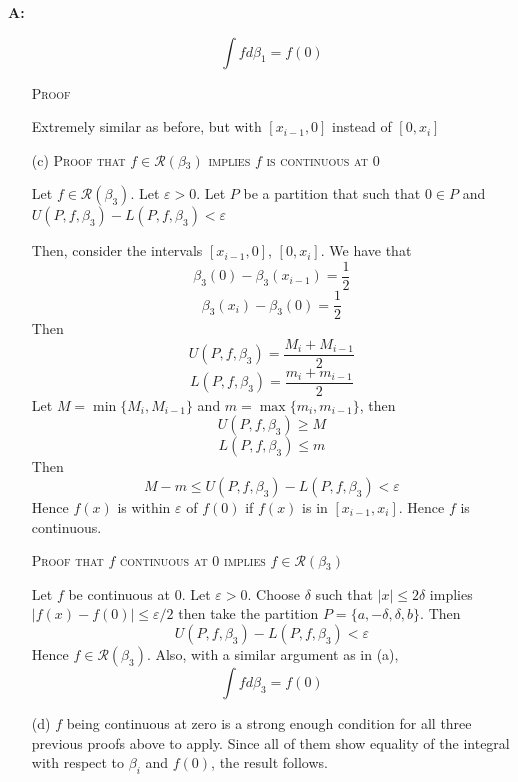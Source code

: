\documentclass{article}
\newenvironment{Answer} {\par\noindent\textbf{A:}} {}
\begin{document}
\begin{Answer}
\begin{itemize}
        \[\int f d\beta_1 = f(0)\]

        \textsc{Proof}

        Extremely similar as before, but with $[x_{i-1}, 0]$ instead of $[0, x_i]$

        \item [(c)]         
            \textsc{Proof that $f \in \mathscr{R}(\beta_3)$ implies $f$ is continuous at $0$}

            Let $f \in \mathscr{R}(\beta_3)$. Let $\varepsilon > 0$. Let $P$ be a partition that such that $0 \in P$ and $U(P, f, \beta_3) - L(P, f, \beta_3) < \varepsilon$

            Then, consider the intervals $[x_{i-1}, 0]$, $[0, x_i]$. We have that
            \[\beta_3(0) - \beta_3(x_{i-1}) = \frac{1}{2}\]
            \[\beta_3(x_i) - \beta_3(0) = \frac{1}{2}\]
            Then 
            \[U(P, f, \beta_3) = \frac{M_i + M_{i-1}}{2}\]
            \[L(P, f, \beta_3) = \frac{m_i + m_{i-1}}{2}\]
            Let $M = \min \{ M_i, M_{i-1} \}$ and $m = \max \{ m_i, m_{i-1}\}$, then
            \[U(P, f, \beta_3) \geq M \]
            \[L(P, f, \beta_3) \leq m\]
            Then 
            \[M - m \leq U(P, f, \beta_3) - L(P, f, \beta_3) < \varepsilon\]
            Hence $f(x)$ is within $\varepsilon$ of $f(0)$ if $f(x)$ is in $[x_{i-1}, x_i]$. Hence $f$ is continuous.

            \textsc{Proof that $f$ continuous at $0$ implies $f \in \mathscr{R}(\beta_3)$}

            Let $f$ be continuous at $0$. Let $\varepsilon > 0$. Choose $\delta$ such that $|x| \leq 2\delta$ implies $|f(x) - f(0)| \leq \varepsilon/2$ then take the partition $P = \{a, -\delta, \delta, b\}$. Then
        \[U(P, f, \beta_3) - L(P, f, \beta_3) < \varepsilon\]
        Hence $f \in \mathscr{R}(\beta_3)$. Also, with a similar argument as in (a), 
        \[\int f d\beta_3 = f(0)\]


        \item [(d)] 
            $f$ being continuous at zero is a strong enough condition for all three previous proofs above to apply. Since all of them show equality of the integral with respect to $\beta_i$ and $f(0)$, the result follows.
    \end{itemize}
\end{Answer}
\end{document}
